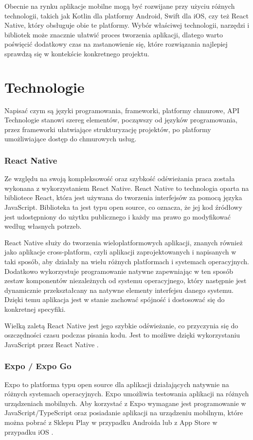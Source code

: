 \phantom{th} Obecnie na rynku aplikacje mobilne mogą być rozwijane przy użyciu różnych technologii, takich jak Kotlin dla platformy Android, Swift dla iOS, czy też React Native, który obsługuje obie te platformy. Wybór właściwej technologii, narzędzi i bibliotek może znacznie ułatwić proces tworzenia aplikacji, dlatego warto poświęcić dodatkowy czas na zastanowienie się, które rozwiązania najlepiej sprawdzą się w kontekście konkretnego projektu.

\section{Technologie}
Napisać czym są języki programowania, frameworki, platformy chmurowe, API\\

\phantom{Th}
Technologie stanowi szereg elementów, począwszy od języków programowania, przez frameworki ułatwiające strukturyzację projektów, po platformy umożliwiające dostęp do chmurowych usług.

\subsubsection*{\textbf{React Native}}
\phantom{th}
Ze względu na swoją kompleksowość oraz szybkość odświeżania praca została wykonana z wykorzystaniem React Native.
React Native to technologia oparta na bibliotece React,
która jest używana do tworzenia interfejsów za pomocą języka JavaScript. Biblioteka ta jest typu open source, co oznacza, że jej kod źródłowy jest udostępniony do użytku publicznego i każdy ma prawo go modyfikować według własnych potrzeb.

React Native służy do tworzenia wieloplatformowych aplikacji, znanych również jako aplikacje cross-platform,
czyli aplikacji zaprojektowanych i napisanych w taki sposób, aby działały na wielu różnych platformach i systemach operacyjnych.
Dodatkowo wykorzystuje programowanie natywne zapewniając w ten sposób zestaw komponentów niezależnych od systemu operacyjnego,
który następnie jest dynamicznie przekształcany na natywne elementy interfejsu danego systemu. Dzięki temu aplikacja jest w stanie
zachować spójność i dostosować się do  konkretnej specyfiki.

Wielką zaletą React Native jest jego szybkie odświeżanie, co przyczynia się do oszczędności czasu podczas pisania kodu.
Jest to możliwe dzięki wykorzystaniu JavaScript przez React Native \cite{reactnative}.

\subsubsection*{\textbf{Expo / Expo Go}}
\phantom{Th}
Expo to platforma typu open source dla aplikacji działających natywnie na różnych systemach operacyjnych.
Expo umożliwia testowania aplikacji na różnych urządzeniach mobilnych. Aby korzystać z Expo wymagane jest programowanie w JavaScript/TypeScript
oraz posiadanie aplikacji na urządzeniu mobilnym, które można pobrać z Sklepu Play w przypadku Androida lub z App Store w przypadku iOS
\cite{expogo}.

